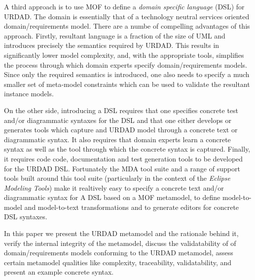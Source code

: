 A third approach is to use MOF to define a {\em domain specific language} (DSL) for URDAD. The domain is essentially that of a technology neutral services oriented domain/requirements model. There are a numbe of compelling advantages of this approach. Firstly, resultant language is a fraction of the size of UML and introduces precisely the semantics required by URDAD. This results in significantly lower model complexity, and, with the appropriate tools, simplifies the process through which domain experts specify domain/requirements models. Since only the required semantics is introduced, one also needs to specify a much smaller set of meta-model constraints which can be used to validate the resultant instance models.

On the other side, introducing a DSL requires that one specifies concrete test and/or diagrammatic syntaxes for the DSL and that one either develops or generates tools which capture and URDAD model through a concrete text or diagrammatic syntax. It also requires that domain experts learn a concrete syntax as well as the tool through which the concrete syntax is captured. Finally, it requires code code, documentation and test generation tools to be developed for the URDAD DSL. Fortunately the MDA tool suite and a range of support tools built around this tool suite (particularly in the context of the {\em Eclipse Modeling Tools}) make it realtively easy to specify a concrete text and/or diagrammatic syntax for A DSL based on a MOF metamodel, to define model-to-model and model-to-text transformations and to generate editors for concrete DSL syntaxes.

In this paper we present the URDAD metamodel and the rationale behind it, verify the internal integrity of the metamodel, discuss the validatability of of domain/requirements models conforming to the URDAD metamodel, assess certain metamodel qualities like complexity, traceability, validatability, and present an example concrete syntax.

